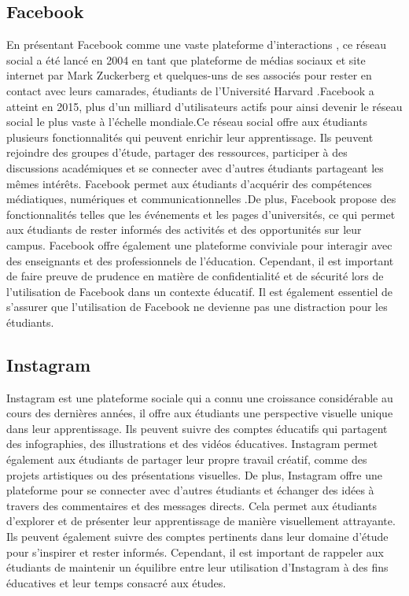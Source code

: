 \documentclass[12pt,a4paper,titlepage]{article}
\begin{document}
\subsection{Facebook} 
En présentant Facebook comme une vaste plateforme d’interactions ,  ce réseau social a été lancé en 2004 en tant que plateforme de médias sociaux et site internet par Mark Zuckerberg et quelques-uns de ses associés pour rester en contact avec leurs camarades, étudiants de l'Université Harvard .Facebook a atteint en 2015, plus d'un milliard d'utilisateurs actifs pour ainsi devenir le réseau social le plus vaste à l'échelle mondiale.Ce réseau social offre aux étudiants plusieurs fonctionnalités qui peuvent enrichir leur apprentissage. Ils peuvent rejoindre des groupes d'étude, partager des ressources, participer à des discussions académiques et se connecter avec d'autres étudiants partageant les mêmes intérêts. Facebook permet aux étudiants d’acquérir des compétences médiatiques, numériques et communicationnelles .De plus, Facebook propose des fonctionnalités telles que les événements et les pages d'universités, ce qui permet aux étudiants de rester informés des activités et des opportunités sur leur campus. Facebook offre également une plateforme conviviale pour interagir avec des enseignants et des professionnels de l'éducation. Cependant, il est important de faire preuve de prudence en matière de confidentialité et de sécurité lors de l'utilisation de Facebook dans un contexte éducatif. Il est également essentiel de s'assurer que l'utilisation de Facebook ne devienne pas une distraction pour les étudiants.
\subsection{Instagram}
Instagram est une plateforme sociale qui a connu une croissance considérable au cours des dernières années, il  offre aux étudiants une perspective visuelle unique dans leur apprentissage. Ils peuvent suivre des comptes éducatifs qui partagent des infographies, des illustrations et des vidéos éducatives. Instagram permet également aux étudiants de partager leur propre travail créatif, comme des projets artistiques ou des présentations visuelles. De plus, Instagram offre une plateforme pour se connecter avec d'autres étudiants et échanger des idées à travers des commentaires et des messages directs. Cela permet aux étudiants d'explorer et de présenter leur apprentissage de manière visuellement attrayante. Ils peuvent également suivre des comptes pertinents dans leur domaine d'étude pour s'inspirer et rester informés. Cependant, il est important de rappeler aux étudiants de maintenir un équilibre entre leur utilisation d'Instagram à des fins éducatives et leur temps consacré aux études. 
\end{document}
